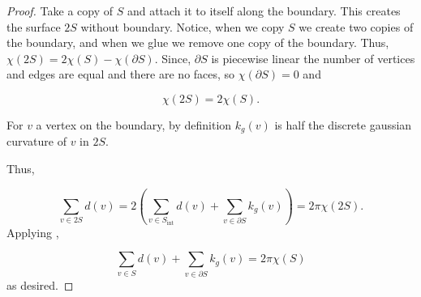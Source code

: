 \begin{proof}
Take a copy of $S$ and attach it to itself along the boundary.
This creates the surface $2S$ without boundary. Notice,
when we copy $S$ we create two copies of the boundary, and when
we glue we remove one copy of the boundary.
Thus, $\chi(2S)=2\chi(S)-\chi(\partial S).$
Since, $\partial S$ is piecewise linear the number of vertices and
edges are equal and there are no faces, so $\chi(\partial S)=0$
and 

\begin{equation} \label{eqn:glue}
\chi(2S)=2\chi(S).
\end{equation}

For $v$ a vertex on the boundary, by definition $k_g(v)$ is half
the discrete gaussian curvature of $v$ in $2S.$

Thus,

$$\sum_{v\in 2S}d(v)=2\left(\sum_{v\in S_{\text{int}}}d(v)+\sum_{v\in \partial S} k_g(v)\right) =2\pi  \chi(2S).$$
Applying ,

$$\sum_{v\in S}d(v)+\sum_{v\in \partial S} k_g(v)=2\pi  \chi(S)$$
as desired.

\end{proof}